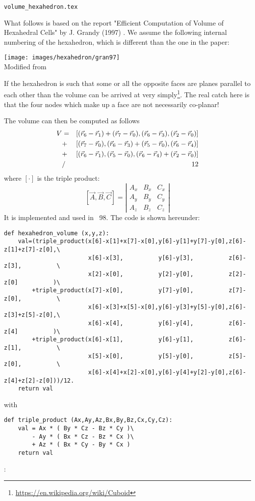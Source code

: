 \begin{flushright} {\tiny {\color{gray} \tt volume\_hexahedron.tex}} \end{flushright}

What follows is based on the report "Efficient Computation of Volume of
Hexahedral Cells" by J. Grandy (1997) \cite{gran97}.
We assume the following internal numbering of the hexahedron,
which is different than the one in the paper: 

\begin{center}
\texttt{[image: images/hexahedron/gran97]}\\
{\captionfont Modified from \cite{gran97}}
\end{center}

If the hexahedron is such that some or all the opposite faces are planes parallel to 
each other than the volume can be arrived at very 
simply\footnote{\url{https://en.wikipedia.org/wiki/Cuboid}}.
The real catch here is that the four nodes which make up a face are not 
necessarily co-planar!  

The volume can then be computed as follows
\begin{eqnarray}
V &=& [(\vec{r}_6-\vec{r}_1)+(\vec{r}_7-\vec{r}_0),(\vec{r}_6-\vec{r}_3),(\vec{r}_2-\vec{r}_0)] \nonumber\\
  &+& [(\vec{r}_7-\vec{r}_0),(\vec{r}_6-\vec{r}_3)+(\vec{r}_5-\vec{r}_0),(\vec{r}_6-\vec{r}_4)] \nonumber\\
  &+& [(\vec{r}_6-\vec{r}_1),(\vec{r}_5-\vec{r}_0),(\vec{r}_6-\vec{r}_4)+(\vec{r}_2-\vec{r}_0)] \nonumber\\
  &/& 12
\end{eqnarray}
where $[\cdot]$ is the triple product:
\[
[\vec{A},\vec{B},\vec{C}] = 
\left|
\begin{array}{ccc}
A_x & B_x & C_x \\
A_y & B_y & C_y \\
A_z & B_z & C_z 
\end{array}
\right|
\]
It is implemented and used in \stone~98. The code is shown hereunder:
\begin{lstlisting}
def hexahedron_volume (x,y,z):
    val=(triple_product(x[6]-x[1]+x[7]-x[0],y[6]-y[1]+y[7]-y[0],z[6]-z[1]+z[7]-z[0],\
                        x[6]-x[3],          y[6]-y[3],          z[6]-z[3],          \
                        x[2]-x[0],          y[2]-y[0],          z[2]-z[0]          )\
        +triple_product(x[7]-x[0],          y[7]-y[0],          z[7]-z[0],          \
                        x[6]-x[3]+x[5]-x[0],y[6]-y[3]+y[5]-y[0],z[6]-z[3]+z[5]-z[0],\
                        x[6]-x[4],          y[6]-y[4],          z[6]-z[4]          )\
        +triple_product(x[6]-x[1],          y[6]-y[1],          z[6]-z[1],          \
                        x[5]-x[0],          y[5]-y[0],          z[5]-z[0],          \
                        x[6]-x[4]+x[2]-x[0],y[6]-y[4]+y[2]-y[0],z[6]-z[4]+z[2]-z[0]))/12.
    return val
\end{lstlisting}
with 
\begin{lstlisting}
def triple_product (Ax,Ay,Az,Bx,By,Bz,Cx,Cy,Cz):
    val = Ax * ( By * Cz - Bz * Cy )\
        - Ay * ( Bx * Cz - Bz * Cx )\
        + Az * ( Bx * Cy - By * Cx )
    return val
\end{lstlisting}

\Literature: 


